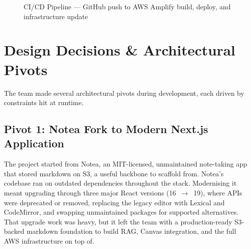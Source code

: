 \documentclass[12pt,a4paper]{article}
\begin{document}
\begin{figure}[H]
{%
}
\caption{CI/CD Pipeline --- GitHub push to AWS Amplify build, deploy, and infrastructure update}
\label{fig:cicd}
\end{figure}


\section{Design Decisions \& Architectural Pivots}
\label{sec:pivots}

The team made several architectural pivots during development, each driven by constraints hit at runtime.

\subsection{Pivot 1: Notea Fork to Modern Next.js Application}
\label{sec:pivot-1}

The project started from Notea, an MIT-licensed, unmaintained note-taking app that stored markdown on S3, a useful backbone to scaffold from. Notea's codebase ran on outdated dependencies throughout the stack. Modernising it meant upgrading through three major React versions (16~$\to$~19), where APIs were deprecated or removed, replacing the legacy editor with Lexical and CodeMirror, and swapping unmaintained packages for supported alternatives. That upgrade work was heavy, but it left the team with a production-ready S3-backed markdown foundation to build RAG, Canvas integration, and the full AWS infrastructure on top of.
\end{document}
